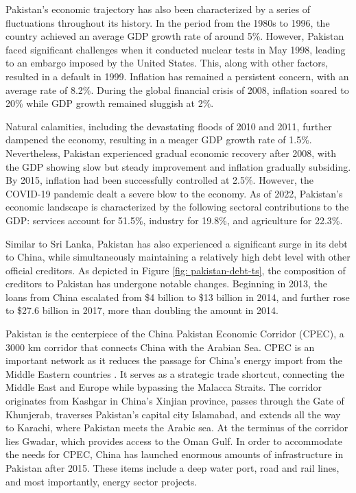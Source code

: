Pakistan's economic trajectory has also been characterized by a series of fluctuations throughout its history. In the period from the 1980s to 1996, the country achieved an average GDP growth rate of around 5\%. However, Pakistan faced significant challenges when it conducted nuclear tests in May 1998, leading to an embargo imposed by the United States. This, along with other factors, resulted in a default in 1999. Inflation has remained a persistent concern, with an average rate of 8.2\%. During the global financial crisis of 2008, inflation soared to 20\% while GDP growth remained sluggish at 2\%.

Natural calamities, including the devastating floods of 2010 and 2011, further dampened the economy, resulting in a meager GDP growth rate of 1.5\%. Nevertheless, Pakistan experienced gradual economic recovery after 2008, with the GDP showing slow but steady improvement and inflation gradually subsiding. By 2015, inflation had been successfully controlled at 2.5\%. However, the COVID-19 pandemic dealt a severe blow to the economy. As of 2022, Pakistan's economic landscape is characterized by the following sectoral contributions to the GDP: services account for 51.5\%, industry for 19.8\%, and agriculture for 22.3\%.

Similar to Sri Lanka, Pakistan has also experienced a significant surge in its debt to China, while simultaneously maintaining a relatively high debt level with other official creditors. As depicted in Figure \ref{fig: pakistan-debt-ts}, the composition of creditors to Pakistan has undergone notable changes.  Beginning in 2013, the loans from China escalated from \$4 billion to \$13 billion in 2014, and further rose to \$27.6 billion in 2017, more than doubling the amount in 2014.


Pakistan is the centerpiece of the China Pakistan Economic Corridor (CPEC), a 3000 km corridor that connects China with the Arabian Sea.
CPEC is an important network as it reduces the passage for China's energy import from the Middle Eastern countries \citep*{CPEC-wiki}.
It serves as a strategic trade shortcut, connecting the Middle East and Europe while bypassing the Malacca Straits. The corridor originates from Kashgar in China's Xinjian province, passes through the Gate of Khunjerab, traverses Pakistan's capital city Islamabad, and extends all the way to Karachi, where Pakistan meets the Arabic sea. At the terminus of the corridor lies Gwadar, which provides access to the Oman Gulf.
In order to accommodate the needs for CPEC, China has launched enormous amounts of infrastructure in Pakistan after 2015. These items include a deep water port, road and rail lines, and most importantly, energy sector projects.

